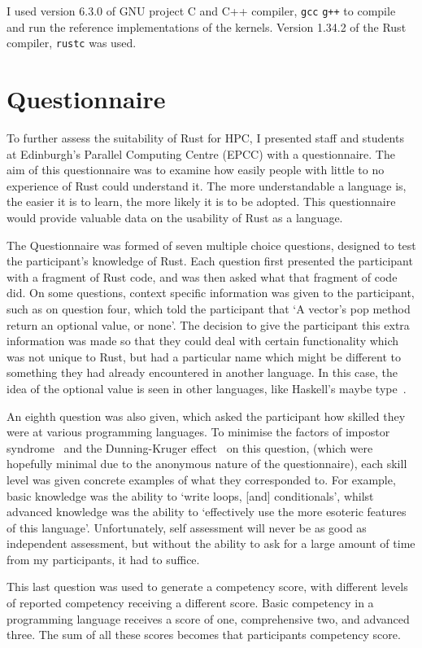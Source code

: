 I used version 6.3.0 of GNU project C  and C++ compiler, \texttt{gcc} \texttt{g++} to compile and run the reference implementations of the kernels. Version 1.34.2 of the Rust compiler, \texttt{rustc} was used.
\section{Questionnaire}
To further assess the suitability of Rust for HPC, I presented staff and students at Edinburgh's Parallel Computing Centre (EPCC) with a questionnaire. The aim of this questionnaire was to examine how easily people with little to no experience of Rust could understand it. The more understandable a language is, the easier it is to learn, the more likely it is to be adopted. This questionnaire would provide valuable data on the usability of Rust as a language.

The Questionnaire was formed of seven multiple choice questions, designed to test the participant's knowledge of Rust. Each question first presented the participant with a fragment of Rust code, and was then asked what that fragment of code did. On some questions, context specific information was given to the participant, such as on question four, which told the participant that `A vector's pop method return an optional value, or none'. The decision to give the participant this extra information was made so that they could deal with certain functionality which was not unique to Rust, but had a particular name which might be different to something they had already encountered in another language. In this case, the idea of the optional value is seen in other languages, like Haskell's maybe type~\cite{HaskellMaybe}.

An eighth question was also given, which asked the participant how skilled they were at various programming languages.
To minimise the factors of impostor syndrome~\cite{langford1993} and the Dunning-Kruger effect~\cite{kruger1999} on this question, (which were hopefully minimal due to the anonymous nature of the questionnaire), each skill level was given concrete examples of what they corresponded to. For example, basic knowledge was the ability to `write loops, [and] conditionals', whilst advanced knowledge was the ability to `effectively use the more esoteric features of this language'. Unfortunately, self assessment will never be as good as independent assessment, but without the ability to ask for a large amount of time from my participants, it had to suffice.

This last question was used to generate a competency score, with different levels of reported competency receiving a different score. Basic competency in a programming language receives a score of one, comprehensive two, and advanced three. The sum of all these scores becomes that participants competency score.

